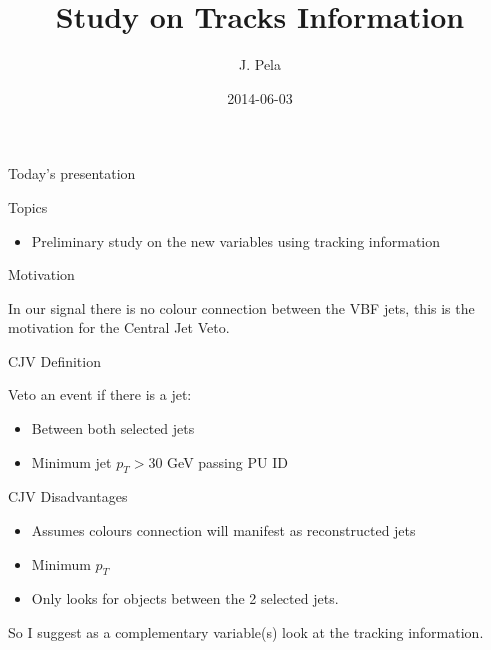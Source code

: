 \documentclass[8pt]{beamer}
\author[J. Pela]{J. Pela}
\title{Study on Tracks Information}
\institute[ICL]{Imperial College London}
\date{2014-06-03}
\begin{document}
\setlength{\unitlength}{1mm}

\begin{frame}
  \titlepage
\end{frame}

\begin{frame}{Today's presentation}
 
\begin{block}{Topics}
 
\begin{itemize}
  \item Preliminary study on the new variables using tracking information
\end{itemize}

\end{block}

\end{frame}

\begin{frame}{Motivation}

In our signal there is no colour connection between the VBF jets, this is the motivation for the Central Jet Veto.

\begin{block}{CJV Definition}

Veto an event if there is a jet:
\begin{itemize}
  \item Between both selected jets
  \item Minimum jet $p_T > 30$ GeV passing PU ID
\end{itemize}

\end{block}

\begin{block}{CJV Disadvantages}
 
\begin{itemize}
  \item Assumes colours connection will manifest as reconstructed jets
  \item Minimum $p_T$ 
  \item Only looks for objects between the 2 selected jets.
\end{itemize}

\end{block}

So I suggest as a complementary variable(s) look at the tracking information.

\end{frame}
\end{document}
